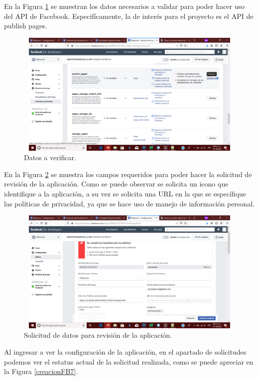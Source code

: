 	\noindent En la Figura \ref{creacionFB2} se muestran los datos necesarios a validar para poder hacer uso del API de Facebook. Especifícamente, la de interés para el proyecto es el API de publish pages.
	\begin{figure}[hbt!]
		\centering
		\includegraphics[width=15cm, height=6cm]{Imagenes/FacebookAPI/Facebook2}
		\caption{Datos a verificar.}
		\label{creacionFB2}
	\end{figure}

	\noindent En la Figura \ref{creacionFB3} se muestra los campos requeridos para poder hacer la solicitud de revisión de la aplicación. Como se puede observar se solicita un icono que identifique a la aplicación, a su vez se solicita una URL en la que se específique las políticas de privacidad, ya que se hace uso de manejo de información personal.
\pagebreak
	\begin{figure}[hbt!]
		\centering
		\includegraphics[width=15cm, height=6cm]{Imagenes/FacebookAPI/Facebook3}
		\caption{Solicitud de datos para revisión de la aplicación.}
		\label{creacionFB3}
	\end{figure}

	\noindent Al ingresar a ver la configuración de la aplicación, en el apartado de solicitudes podemos ver el estatus actual de la solicitud realizada, como se puede apreciar en la Figura \ref{creacionFB7}.

